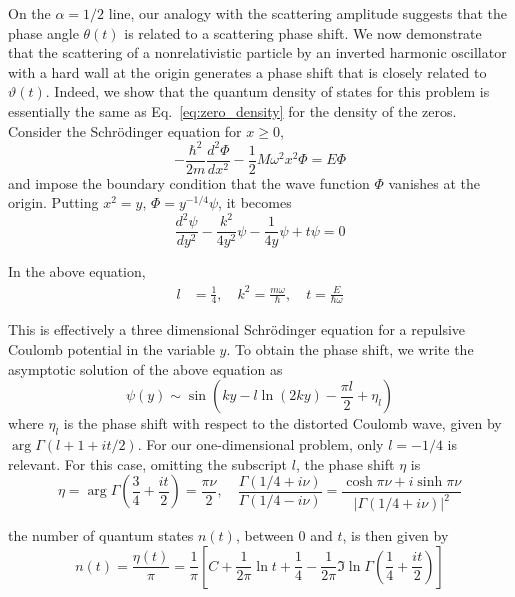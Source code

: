 \documentclass[11pt]{article}
\theoremstyle{plain}
\begin{document}
On the $\alpha = 1/2$ line, our analogy with the scattering amplitude suggests that the phase angle $\theta(t)$ is related to a scattering phase shift. We now demonstrate that the scattering of a nonrelativistic particle by an inverted harmonic oscillator with a hard wall at the origin generates a phase shift that is closely related to $\vartheta(t)$. Indeed, we show that the quantum density of states for this problem is essentially the same as Eq.~\eqref{eq:zero_density} for the density of the zeros. Consider the Schrödinger equation for $x \geq 0$,
\begin{equation}
-\frac{\hbar^2}{2m} \frac{d^2\Phi}{dx^2} - \frac{1}{2}M\omega^2x^2\Phi = E\Phi
\label{eq:schrodinger}
\end{equation}
and impose the boundary condition that the wave function $\Phi$ vanishes at the origin. Putting $x^2 = y$, $\Phi = y^{-1/4}\psi$, it becomes
\begin{equation}
\frac{d^2\psi}{dy^2} - \frac{k^2}{4y^2}\psi - \frac{1}{4y}\psi + t\psi = 0
\label{eq:transformed_schrodinger}
\end{equation}

In the above equation,
\begin{align}
l &= \frac{1}{4}, \quad k^2 = \frac{m\omega}{\hbar}, \quad t = \frac{E}{\hbar\omega}
\label{eq:parameters}
\end{align}

This is effectively a three dimensional Schrödinger equation for a repulsive Coulomb potential in the variable $y$. To obtain the phase shift, we write the asymptotic solution of the above equation as
\begin{equation}
\psi(y) \sim \sin\left(ky - l\ln(2ky) - \frac{\pi l}{2} + \eta_l\right)
\label{eq:asymptotic_solution}
\end{equation}
where $\eta_l$ is the phase shift with respect to the distorted Coulomb wave, given by $\arg \Gamma(l + 1 + it/2)$. For our one-dimensional problem, only $l = -1/4$ is relevant. For this case, omitting the subscript $l$, the phase shift $\eta$ is
\begin{equation}
\eta = \arg \Gamma\left(\frac{3}{4} + \frac{it}{2}\right) = \frac{\pi\nu}{2}, \quad \frac{\Gamma(1/4 + i\nu)}{\Gamma(1/4 - i\nu)} = \frac{\cosh \pi\nu + i \sinh \pi\nu}{|\Gamma(1/4 + i\nu)|^2}
\label{eq:phase_shift}
\end{equation}

the number of quantum states $n(t)$, between 0 and $t$, is then given by
\begin{equation}
n(t) = \frac{\eta(t)}{\pi} = \frac{1}{\pi} \left[ C + \frac{1}{2\pi} \ln t + \frac{1}{4} - \frac{1}{2\pi} \Im \ln \Gamma\left(\frac{1}{4} + \frac{it}{2}\right) \right]
\label{eq:quantum_states}
\end{equation}
\end{document}
